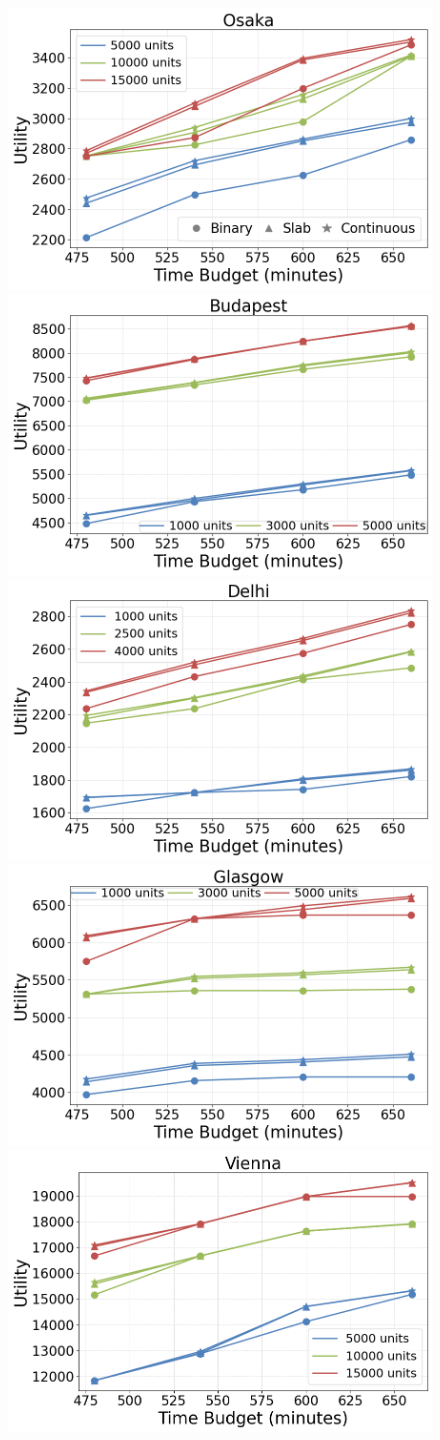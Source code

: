\begin{figure}[t]
	\centering
    \includegraphics[width=0.60\columnwidth]{plots/exp1-osaka.png}
    \includegraphics[width=0.60\columnwidth]{plots/exp1-budapest.png}
    \includegraphics[width=0.60\columnwidth]{plots/exp1-delhi.png}
    \includegraphics[width=0.60\columnwidth]{plots/exp1-glasgow.png}
    \includegraphics[width=0.60\columnwidth]{plots/exp1-vienna.png}

\end{figure}
